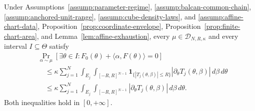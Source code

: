 \begin{proposition}
\label{prop:affine-bound}
Under Assumptions~\ref{assump:parameter-regime},
\ref{assump:balcan-common-chain},
\ref{assump:anchored-unit-range},
\ref{assump:cube-density-laws}, and
\ref{assump:affine-chart-data}, Proposition~\ref{prop:coordinate-envelope},
Proposition~\ref{prop:finite-chart-area}, and
Lemma~\ref{lem:affine-exhaustion}, every
$\mu\in\mathcal D_{N,R,\kappa}$ and every interval $I\subseteq\Theta$
satisfy
\begin{equation}
\begin{aligned}
&\Pr_{\alpha\sim\mu}
[\exists\theta\in I:F_0(\theta)+\langle\alpha,F(\theta)\rangle=0]\\
&\quad\leq\kappa\sum_{j=1}^N
\int_{E_j}\int_{[-R,R]^{N-1}}
\mathbf1_{\{|T_j(\theta,\beta)|\leq R\}}
|\partial_\theta T_j(\theta,\beta)|\,d\beta\,d\theta\\
&\quad\leq\kappa\sum_{j=1}^N
\int_{E_j}\int_{[-R,R]^{N-1}}
|\partial_\theta T_j(\theta,\beta)|\,d\beta\,d\theta.
\end{aligned}
\label{eq:appendix-39}
\end{equation}
Both inequalities hold in $[0,+\infty]$.
\end{proposition}

